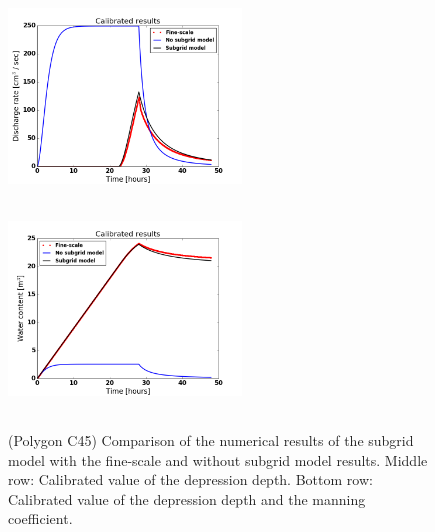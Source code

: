 \documentclass[review,11pt]{elsarticle}
\begin{document}
\begin{figure}[!h]
\includegraphics[width=6.2cm, height=5.5cm]{./figures/POLYGON45/POLYGON45dischargeCalibDDManning.png}
\includegraphics[width=6.2cm, height=5.5cm]{./figures/POLYGON45/POLYGON45watercontentCalibDDManning.png}
\caption{(Polygon C45) Comparison of the numerical results of the subgrid model with the fine-scale and without subgrid model results. Middle row: Calibrated value of the depression depth. Bottom row: Calibrated value of the depression depth and the manning coefficient.}
\label{polygon-C45}
\end{figure}
\end{document}
